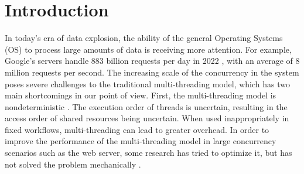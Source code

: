 \documentclass[sigconf,review,anonymous]{acmart}
\begin{document}


\maketitle

\section{Introduction}
\label{section: introduction}

In today's era of data explosion, the ability of the general Operating Systems (OS) to process large amounts of data is receiving more attention. For example, Google's servers handle 883 billion requests per day in 2022 \cite{google-search-statistics}, with an average of 8 million requests per second. The increasing scale of the concurrency in the system poses severe challenges to the traditional multi-threading model, which has two main shortcomings in our point of view. First, the multi-threading model is nondeterministic \cite{Lee:EECS-2006-1}. The execution order of threads is uncertain, resulting in the access order of shared resources being uncertain. When used inappropriately in fixed workflows, multi-threading can lead to greater overhead. In order to improve the performance of the multi-threading model in large concurrency scenarios such as the web server, some research has tried to optimize it, but has not solved the problem mechanically \cite{li_combining_2007, howell_cooperative_2002}.
\end{document}
